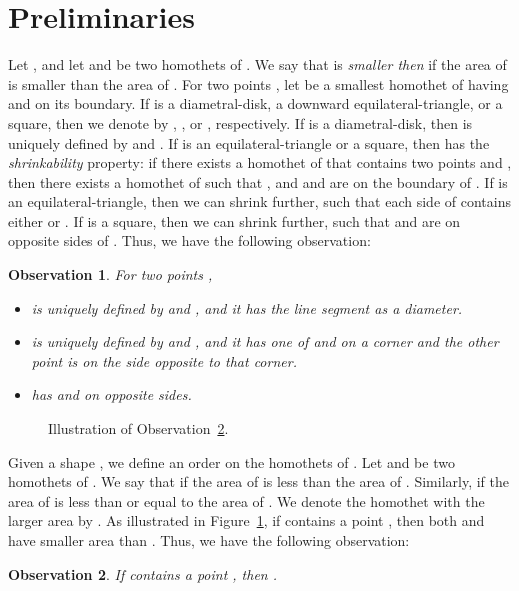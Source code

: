 \documentclass[11pt,a4paper]{article}
\newtheorem{observation}{Observation}
\begin{document}
\section{Preliminaries}
\label{preliminaries}

Let , and let  and  be two homothets of . We say that  is {\em smaller then}  if the area of  is smaller than the area of . For two points , let  be a smallest homothet of  having  and  on its boundary. If  is a diametral-disk, a downward equilateral-triangle, or a square, then we denote  by , , or , respectively. If  is a diametral-disk, then  is uniquely defined by  and . If  is an equilateral-triangle or a square, then  has the {\em shrinkability} property: if there exists a homothet  of  that contains two points  and , then there exists a homothet  of  such that , and  and  are on the boundary of . If  is an equilateral-triangle, then we can
shrink  further, such that each side of  contains either  or . If  is a square, then we can
shrink  further, such that  and  are on opposite sides of . Thus, we have the following observation:

\begin{observation}
\label{shrink-triangle-obs}
For two points ,
\begin{itemize}
 \item  is uniquely defined by  and , and it has the line segment  as a diameter.
\item  is uniquely defined by  and , and it has one of  and  on a corner and the other point is
on the side opposite to that corner.
\item  has  and  on opposite sides.
\end{itemize}
\end{observation}

\begin{figure}[htb]
  \centering
\setlength{\tabcolsep}{0in}
  
  \caption{Illustration of Observation~\ref{obs1}.}
\label{mst-in-GS-fig}
\end{figure}
Given a shape , we define an order on the homothets of . Let  and  be two homothets of . We say that  if the area of  is less than the area of . Similarly,  if the area of  is less than or equal to the area of . We denote the homothet with the larger area by . As illustrated in Figure~\ref{mst-in-GS-fig}, if  contains a point , then both  and  have smaller area than . Thus, we have the following observation:
 
\begin{observation}
\label{obs1}
 If  contains a point , then .
\end{observation}
\end{document}
